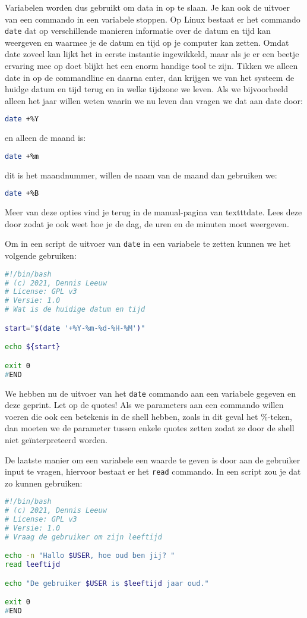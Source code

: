 Variabelen worden dus gebruikt om data in op te slaan. Je kan ook de uitvoer van een commando in een variabele stoppen. Op Linux bestaat er het commando \texttt{date} dat op verschillende manieren informatie over de datum en tijd kan weergeven en waarmee je de datum en tijd op je computer kan zetten. Omdat date zoveel kan lijkt het in eerste instantie ingewikkeld, maar als je er een beetje ervaring mee op doet blijkt het een enorm handige tool te zijn. Tikken we alleen date in op de commandline en daarna enter, dan krijgen we van het systeem de huidge datum en tijd terug en in welke tijdzone we leven. Als we bijvoorbeeld alleen het jaar willen weten waarin we nu leven dan vragen we dat aan date door:
\begin{lstlisting}[language=bash]
date +%Y
\end{lstlisting}
en alleen de maand is:
\begin{lstlisting}[language=bash]
date +%m
\end{lstlisting}
dit is het maandnummer, willen de naam van de maand dan gebruiken we:
\begin{lstlisting}[language=bash]
date +%B
\end{lstlisting}
Meer van deze opties vind je terug in de manual-pagina van texttt{date}. Lees deze door zodat je ook weet hoe je de dag, de uren en de minuten moet weergeven.

Om in een script de uitvoer van \texttt{date} in een variabele te zetten kunnen we het volgende gebruiken:
\begin{lstlisting}[language=bash]
#!/bin/bash
# (c) 2021, Dennis Leeuw
# License: GPL v3
# Versie: 1.0
# Wat is de huidige datum en tijd

start="$(date '+%Y-%m-%d-%H-%M')"

echo ${start}

exit 0
#END
\end{lstlisting}
We hebben nu de uitvoer van het \texttt{date} commando aan een variabele gegeven en deze geprint. Let op de quotes! Als we parameters aan een commando willen voeren die ook een betekenis in de shell hebben, zoals in dit geval het \%-teken, dan moeten we de parameter tussen enkele quotes zetten zodat ze door de shell niet ge\"interpreteerd worden.

De laatste manier om een variabele een waarde te geven is door aan de gebruiker input te vragen, hiervoor bestaat er het \texttt{read} commando. In een script zou je dat zo kunnen gebruiken:
\begin{lstlisting}[language=bash]
#!/bin/bash
# (c) 2021, Dennis Leeuw
# License: GPL v3
# Versie: 1.0
# Vraag de gebruiker om zijn leeftijd

echo -n "Hallo $USER, hoe oud ben jij? "
read leeftijd

echo "De gebruiker $USER is $leeftijd jaar oud."

exit 0
#END
\end{lstlisting}

